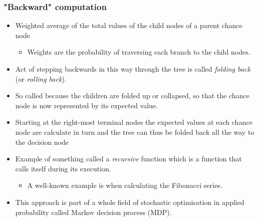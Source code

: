 \begin{frame}
\frametitle{"Backward" computation}

\begin{itemize}
 \item Weighted average of the total values of the child nodes of a parent chance node
 \begin{itemize}
  \item Weights are the probability of traversing each branch to the child nodes.
 \end{itemize}
\pause
 \item Act of stepping backwards in this way through the tree is called \emph{folding back} (or \emph{rolling back}).
\pause
 \item So called because the children are folded up or collapsed, so that the chance node is now represented by its expected value.
\pause
 \item Starting at the right-most terminal nodes the expected values at each chance node are calculate in turn and the tree can thus be folded back all the way to the decision node
\pause
 \item Example of something called a \emph{recursive} function which is a function that calls itself during its execution.
 \begin{itemize}
  \item A well-known example is when calculating the Fibonacci series.
  \end{itemize}
 \item This approach is part of a whole field of stochastic optimisation in applied probability called Markov decision process (MDP).
 \end{itemize}

\end{frame}

